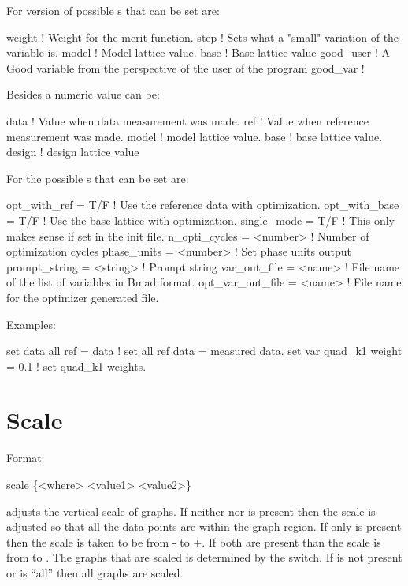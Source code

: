 For  version of  possible 
s that can be set are:
\begin{example}
  weight     ! Weight for the merit function.
  step       ! Sets what a "small" variation of the variable is.
  model      ! Model lattice value.
  base       ! Base lattice value
  good_user  ! A Good variable from the perspective of the user of the \tao program
  good_var   ! 
\end{example}
Besides a numeric value  can be:
\begin{example}
  data        ! Value when data measurement was made.
  ref         ! Value when reference measurement was made.
  model       ! model lattice value.
  base        ! base lattice value.
  design      ! design lattice value
\end{example}

For  the possible 
s that can be set are:
\begin{example}
  opt_with_ref      = T/F      ! Use the reference data with optimization.
  opt_with_base     = T/F      ! Use the base lattice with optimization.
  single_mode       = T/F      ! This only makes sense if set in the init file.
  n_opti_cycles     = <number> ! Number of optimization cycles
  phase_units       = <number> ! Set phase units output
  prompt_string     = <string> ! Prompt string
  var_out_file      = <name>   ! File name of the list of variables in Bmad format. 
  opt_var_out_file  = <name>   ! File name for the optimizer generated file.
\end{example}

Examples:
\begin{example}
  set data all ref = data       ! set all ref data = measured data.
  set var quad\_k1 weight = 0.1 ! set quad\_k1 weights. 
\end{example}

\section{Scale}
\label{s:scale}

Format:
\begin{example}
  scale \{<where> <value1> <value2>\}
\end{example}

\vskip 0.2in 
 adjusts the vertical scale of graphs. If neither
 nor  is present then the scale is adjusted
so that all the data points are within the graph region.  If only
 is present then the scale is taken to be from
- to +. If both are present than the scale
is from  to .  The graphs that are scaled is
determined by the  switch. If  is not present
or  is ``all'' then all graphs are scaled.

